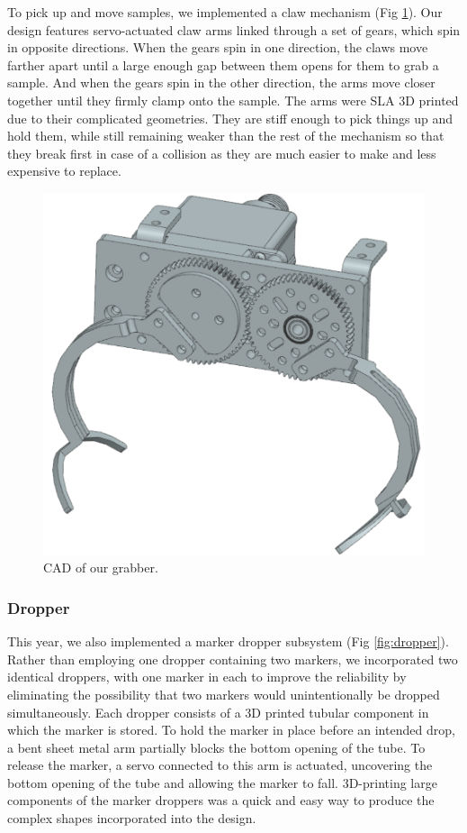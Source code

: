 \documentclass[conference]{IEEEtran}
\begin{document}
To pick up and move samples, we implemented a claw mechanism (Fig \ref{fig:grabber}). Our design features servo-actuated claw arms linked through a set of gears, which spin in opposite directions. When the gears spin in one direction, the claws move farther apart until a large enough gap between them opens for them to grab a sample. And when the gears spin in the other direction, the arms move closer together until they firmly clamp onto the sample. The arms were SLA 3D printed due to their complicated geometries. They are stiff enough to pick things up and hold them, while still remaining weaker than the rest of the mechanism so that they break first in case of a collision as they are much easier to make and less expensive to replace.

\begin{figure}
    \centerline{\includegraphics[scale=0.13]{images/grabberPicNew.png}}
    \caption{CAD of our grabber.}
    \label{fig:grabber}
\end{figure}

\subsubsection{Dropper}
\label{sssec:dropper}
This year, we also implemented a marker dropper subsystem (Fig \ref{fig:dropper}). Rather than employing one dropper containing two markers, we incorporated two identical droppers, with one marker in each to improve the reliability by eliminating the possibility that two markers would unintentionally be dropped simultaneously. Each dropper consists of a 3D printed tubular component in which the marker is stored. To hold the marker in place before an intended drop, a bent sheet metal arm partially blocks the bottom opening of the tube. To release the marker, a servo connected to this arm is actuated, uncovering the bottom opening of the tube and allowing the marker to fall. 3D-printing large components of the marker droppers was a quick and easy way to produce the complex shapes incorporated into the design.
\end{document}
